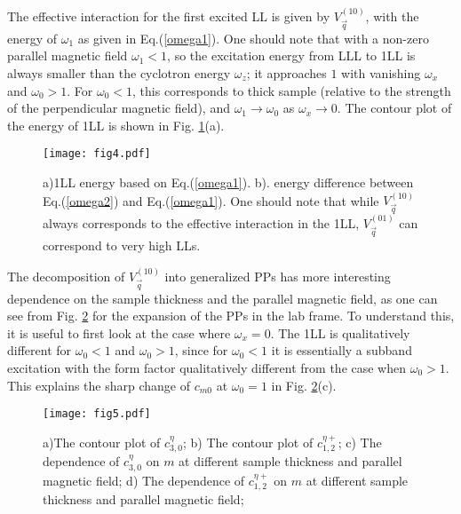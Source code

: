 \documentclass[twocolumn,showpacs,amsmath,amstex,amssymb,mathfonts,prb]{revtex4-1}
\begin{document}
The effective interaction for the first excited LL is given by $V_{\vec q}^{\left(10\right)}$, with the energy of $\omega_1$ as given in Eq.(\ref{omega1}). One should note that with a non-zero parallel magnetic field $\omega_1<1$, so the excitation energy from LLL to 1LL is always smaller than the cyclotron energy $\omega_z$; it approaches $1$ with vanishing $\omega_x$ and $\omega_0>1$. For $\omega_0<1$, this corresponds to thick sample (relative to the strength of the perpendicular magnetic field), and $\omega_1\rightarrow\omega_0$ as $\omega_x\rightarrow 0$. The contour plot of the energy of 1LL is shown in Fig. \ref{LLenergy}(a).
\begin{figure}[htb]
\texttt{[image: fig4.pdf]}
\caption{a)1LL energy based on Eq.(\ref{omega1}). b). energy difference between Eq.(\ref{omega2}) and Eq.(\ref{omega1}). One should note that while $V_{\vec q}^{\left(10\right)}$ always corresponds to the effective interaction in the 1LL, $V_{\vec q}^{\left(01\right)}$ can correspond to very high LLs.}
\label{LLenergy}
\end{figure}

The decomposition of $V_{\vec q}^{\left(10\right)}$ into generalized PPs has more interesting dependence on the sample thickness and the parallel magnetic field, as one can see from Fig. \ref{f4} for the expansion of the PPs in the lab frame. To understand this, it is useful to first look at the case where $\omega_x=0$. The 1LL is qualitatively different for $\omega_0<1$ and $\omega_0>1$, since for $\omega_0<1$ it is essentially a subband excitation with the form factor qualitatively different from the case when $\omega_0>1$. This explains the sharp change of $c_{m0}$ at $\omega_0=1$ in Fig. \ref{f4}(c).   
\begin{figure}[htb]
\texttt{[image: fig5.pdf]}
\caption{a)The contour plot of $c^\eta_{3,0}$; b) The contour plot of $c^{\eta+}_{1,2}$; c) The dependence of $c^\eta_{3,0}$ on $m$ at different sample thickness and parallel magnetic field; d) The dependence of $c^{\eta+}_{1,2}$ on $m$ at different sample thickness and parallel magnetic field;}
\label{f4}
\end{figure} 
\end{document}
